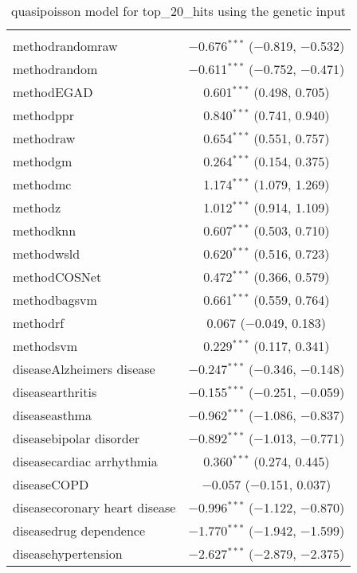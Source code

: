 
\begin{table}[!htbp] \centering 
  \caption{quasipoisson model for top_20_hits using the genetic input} 
  \label{} 
\begin{tabular}{@{\extracolsep{5pt}}lc} 
\\[-1.8ex]\hline 
\hline \\[-1.8ex] 
 methodrandomraw & $-$0.676$^{***}$ ($-$0.819, $-$0.532) \\ 
  methodrandom & $-$0.611$^{***}$ ($-$0.752, $-$0.471) \\ 
  methodEGAD & 0.601$^{***}$ (0.498, 0.705) \\ 
  methodppr & 0.840$^{***}$ (0.741, 0.940) \\ 
  methodraw & 0.654$^{***}$ (0.551, 0.757) \\ 
  methodgm & 0.264$^{***}$ (0.154, 0.375) \\ 
  methodmc & 1.174$^{***}$ (1.079, 1.269) \\ 
  methodz & 1.012$^{***}$ (0.914, 1.109) \\ 
  methodknn & 0.607$^{***}$ (0.503, 0.710) \\ 
  methodwsld & 0.620$^{***}$ (0.516, 0.723) \\ 
  methodCOSNet & 0.472$^{***}$ (0.366, 0.579) \\ 
  methodbagsvm & 0.661$^{***}$ (0.559, 0.764) \\ 
  methodrf & 0.067 ($-$0.049, 0.183) \\ 
  methodsvm & 0.229$^{***}$ (0.117, 0.341) \\ 
  diseaseAlzheimers disease & $-$0.247$^{***}$ ($-$0.346, $-$0.148) \\ 
  diseasearthritis & $-$0.155$^{***}$ ($-$0.251, $-$0.059) \\ 
  diseaseasthma & $-$0.962$^{***}$ ($-$1.086, $-$0.837) \\ 
  diseasebipolar disorder & $-$0.892$^{***}$ ($-$1.013, $-$0.771) \\ 
  diseasecardiac arrhythmia & 0.360$^{***}$ (0.274, 0.445) \\ 
  diseaseCOPD & $-$0.057 ($-$0.151, 0.037) \\ 
  diseasecoronary heart disease & $-$0.996$^{***}$ ($-$1.122, $-$0.870) \\ 
  diseasedrug dependence & $-$1.770$^{***}$ ($-$1.942, $-$1.599) \\ 
  diseasehypertension & $-$2.627$^{***}$ ($-$2.879, $-$2.375) \\ 

\end{tabular}
\end{table}
